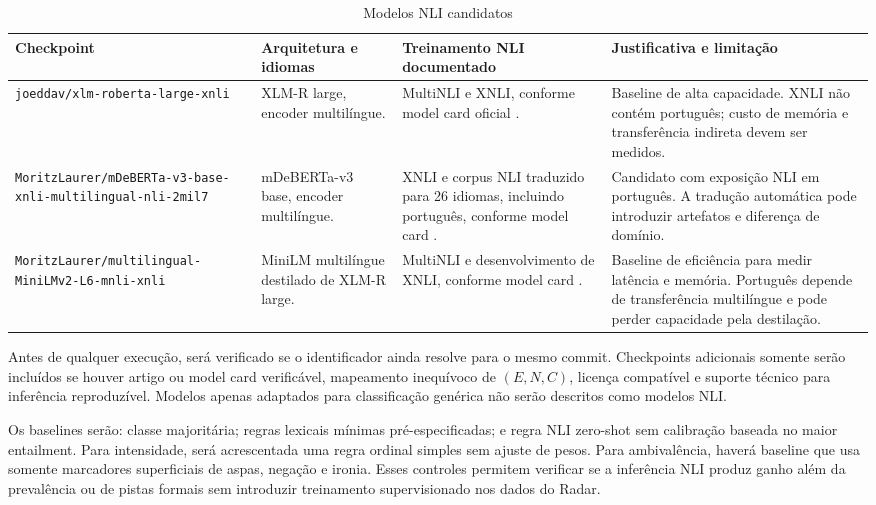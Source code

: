 \begin{table}[htbp]
\centering
\caption{Modelos NLI candidatos}
\label{tab:modelos-candidatos}
\begin{tabular}{|p{}|p{}|p{}|p{}|}
\hline
\textbf{Checkpoint} & \textbf{Arquitetura e idiomas} & \textbf{Treinamento NLI documentado} & \textbf{Justificativa e limitação} \\
\hline
\texttt{joeddav/xlm-roberta-large-xnli} & XLM-R large, encoder multilíngue. & MultiNLI e XNLI, conforme model card oficial \cite{joeddavmodelcard}. & Baseline de alta capacidade. XNLI não contém português; custo de memória e transferência indireta devem ser medidos. \\
\hline
\texttt{MoritzLaurer/mDeBERTa-v3-base-xnli-multilingual-nli-2mil7} & mDeBERTa-v3 base, encoder multilíngue. & XNLI e corpus NLI traduzido para 26 idiomas, incluindo português, conforme model card \cite{laurermdebertacard}. & Candidato com exposição NLI em português. A tradução automática pode introduzir artefatos e diferença de domínio. \\
\hline
\texttt{MoritzLaurer/multilingual-MiniLMv2-L6-mnli-xnli} & MiniLM multilíngue destilado de XLM-R large. & MultiNLI e desenvolvimento de XNLI, conforme model card \cite{laurerminilmcard}. & Baseline de eficiência para medir latência e memória. Português depende de transferência multilíngue e pode perder capacidade pela destilação. \\
\hline
\end{tabular}
\end{table}

Antes de qualquer execução, será verificado se o identificador ainda resolve para o mesmo commit. Checkpoints adicionais somente serão incluídos se houver artigo ou model card verificável, mapeamento inequívoco de \((E,N,C)\), licença compatível e suporte técnico para inferência reproduzível. Modelos apenas adaptados para classificação genérica não serão descritos como modelos NLI.

Os baselines serão: classe majoritária; regras lexicais mínimas pré-especificadas; e regra NLI zero-shot sem calibração baseada no maior entailment. Para intensidade, será acrescentada uma regra ordinal simples sem ajuste de pesos. Para ambivalência, haverá baseline que usa somente marcadores superficiais de aspas, negação e ironia. Esses controles permitem verificar se a inferência NLI produz ganho além da prevalência ou de pistas formais sem introduzir treinamento supervisionado nos dados do Radar.

